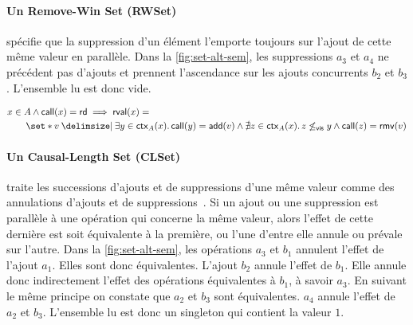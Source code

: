 \paragraph{Un Remove-Win Set (RWSet)} spécifie que la suppression d'un élément l'emporte toujours sur l'ajout de cette même valeur en parallèle.
Dans la \autoref{fig:set-alt-sem}, les suppressions $a_3$ et $a_4$ ne précédent pas d'ajouts et prennent l'ascendance sur les ajouts concurrents $b_2$ et $b_3$.
L'ensemble lu est donc vide.

\begin{equation}\begin{split}
\MoveEqLeft x \in A \land \trm{call}(x) = \trm{rd} \implies \trm{rval}(x) =\\
    &\set*{v \given \exists y \in \trm{ctx}_A(x) \qsep \trm{call}(y) = \trm{add}(v) \land \nexists z \in \trm{ctx}_A(x) \qsep z \not\viseq y \land \trm{call}(z) = \trm{rmv}(v)}
\end{split}\end{equation}

\paragraph{Un Causal-Length Set (CLSet)} \autocite{yu2020_clset} traite les successions d'ajouts et de suppressions d'une même valeur comme des annulations d'ajouts et de suppressions~\autocite{2019_yu_genericundo}.
Si un ajout ou une suppression est parallèle à une opération qui concerne la même valeur, alors l'effet de cette dernière est soit équivalente à la première, ou l'une d'entre elle annule ou prévale sur l'autre.
Dans la \autoref{fig:set-alt-sem}, les opérations $a_3$ et $b_1$ annulent l'effet de l'ajout $a_1$.
Elles sont donc équivalentes.
L'ajout $b_2$ annule l'effet de $b_1$.
Elle annule donc indirectement l'effet des opérations équivalentes à $b_1$, à savoir $a_3$.
En suivant le même principe on constate que $a_2$ et $b_3$ sont équivalentes.
$a_4$ annule l'effet de $a_2$ et $b_3$.
L'ensemble lu est donc un singleton qui contient la valeur $1$.

